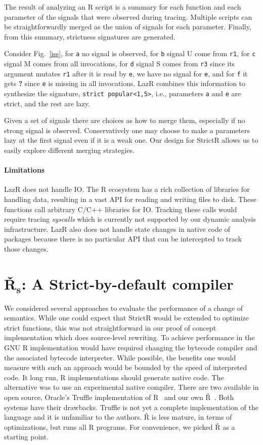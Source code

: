 \documentclass[review,creen,acmsmall]{acmart}
\renewcommand{\c}[1]{\lstinline |#1|\xspace}
\newcommand{\strictr}{{\sf StrictR}\xspace}
\newcommand{\lazr}{{\sf LazR}\xspace}
\renewcommand{\Rsh}{{\sf\v R}\xspace}
\begin{document}
The result of analyzing an R script is a summary for each function and each
parameter of the signals that were observed during tracing. Multiple scripts can
be straightforwardly merged as the union of signals for each parameter. Finally,
from this summary, strictness signatures are generated.

Consider Fig.~\ref{iss}, for \c{a} no signal is observed, for \c{b} signal U
come from \c{r1}, for \c{c} signal M comes from all invocations, for \c{d}
signal S comes from \c{r3} since its argument mutates \c{r1} after it is read by
\c{e}, we have no signal for \c{e}, and for \c{f} it gets \textbf{?} since \c
e is missing in all invocations. \lazr combines this information to synthesize
the signature, \texttt{strict popular<1,5>}, i.e., parameters \c{a} and \c{e}
are strict, and the rest are lazy.

Given a set of signals there are choices as how to merge them, especially if no
strong signal is observed. Conservatively one may choose to make a parameters
lazy at the first signal even if it is a weak one. Our design for \strictr
allows us to easily explore different merging strategies.

\paragraph{Limitations}
\lazr does not handle IO. The R ecosystem has a rich collection of libraries for
handling data, resulting in a vast API for reading and writing files to disk.
These functions call arbitrary C/C++ libraries for IO. Tracking these calls
would require tracing \emph{syscalls} which is currently not supported by our
dynamic analysis infrastructure. \lazr also does not handle state changes in
native code of packages because there is no particular API that can be
intercepted to track those changes.

\section{\v R$_{\mathbf s}$: A Strict-by-default compiler}\label{sec:rsh1}

We considered several approaches to evaluate the performance of a change of
semantics. While one could expect that \strictr would be extended to optimize
strict functions, this was not straightforward in our proof of concept
implementation which does source-level rewriting. To achieve performance in the
GNU R implementation would have required changing the bytecode compiler and the
associated bytecode interpreter. While possible, the benefits one would measure
with such an approach would be bounded by the speed of interpreted code. It long
run, R implementations should generate native code. The alternative was to use
an experimental native compiler. There are two available in open source,
Oracle's Truffle implementation of R~\cite{Stadler16} and our own
\Rsh~\cite{dls19}. Both systems have their drawbacks. Truffle is not yet a
complete implementation of the language and it is unfamiliar to the authors.
\Rsh is less mature, in terms of optimizations, but runs all R programs. For
convenience, we picked \Rsh as a starting point.
\end{document}

